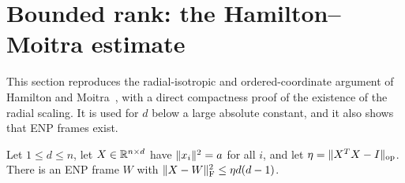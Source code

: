 \section{Bounded rank: the Hamilton--Moitra estimate}\label{sec:bounded}

This section reproduces the radial-isotropic and ordered-coordinate argument of
Hamilton and Moitra~\cite{HM}, with a direct compactness proof of the existence
of the radial scaling. It is used for $d$ below a large
absolute constant, and it also shows that ENP frames exist.

\begin{lemma}\label{lem:HM}
Let $1\le d\le n$, let $X\in\mathbb R^{n\times d}$ have $\lVert x_i\rVert^2=a$ for all $i$,
and let $\eta=\lVert X^TX-I\rVert_{\mathrm{op}}$. There is an ENP frame $W$ with
$\lVert X-W\rVert_{\mathrm F}^2\le\eta d(d-1)$.
\end{lemma}

